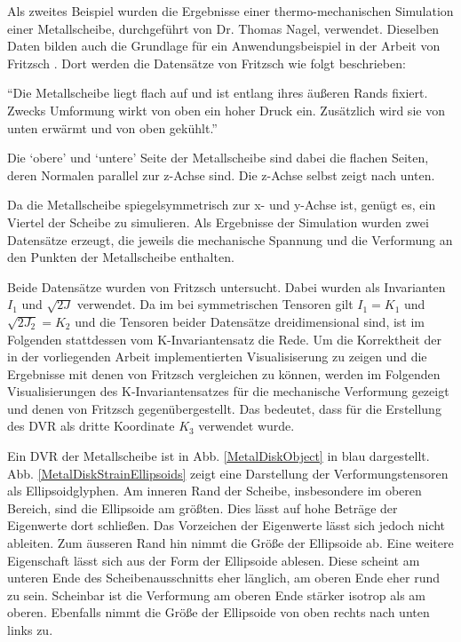 \documentclass[a4paper,fontsize=12pt,toc=bib,halfparskip]{scrartcl}
\begin{document}
Als zweites Beispiel wurden die Ergebnisse einer thermo-mechanischen Simulation einer Metallscheibe, durchgef\"uhrt von Dr. Thomas Nagel, verwendet. Dieselben Daten bilden auch die Grundlage f\"ur ein Anwendungsbeispiel in der Arbeit von Fritzsch \cite[S.15,~45~ ff.]{fritzsch2016continuousScatterplot}. Dort werden die Datens\"atze von Fritzsch wie folgt beschrieben:

``Die Metallscheibe liegt flach auf und ist entlang ihres \"au{\ss}eren Rands fixiert. Zwecks Umformung wirkt von oben ein hoher Druck ein. Zus\"atzlich wird sie von unten erw\"armt und von oben gek\"uhlt.''\cite[S.~15]{fritzsch2016continuousScatterplot}

Die `obere' und `untere' Seite der Metallscheibe sind dabei die flachen Seiten, deren Normalen parallel zur z-Achse sind. Die z-Achse selbst zeigt nach unten.

Da die Metallscheibe spiegelsymmetrisch zur x- und y-Achse ist, gen\"ugt es, ein Viertel der Scheibe zu simulieren. Als Ergebnisse der Simulation wurden zwei Datens\"atze erzeugt, die jeweils die mechanische Spannung und die Verformung an den Punkten der Metallscheibe enthalten. 

Beide Datens\"atze wurden von Fritzsch untersucht. Dabei wurden als Invarianten $I_1$ und $\sqrt{2J}$ verwendet. Da im bei symmetrischen Tensoren gilt $I_1 = K_1$ und $\sqrt{2J_2} = K_2$ und die Tensoren beider Datens\"atze dreidimensional sind, ist im Folgenden stattdessen vom K-Invariantensatz die Rede. Um die Korrektheit der in der vorliegenden Arbeit implementierten Visualisiserung zu zeigen und die Ergebnisse mit denen von Fritzsch vergleichen zu k\"onnen, werden im Folgenden Visualisierungen des K-Invariantensatzes f\"ur die mechanische Verformung gezeigt und denen von Fritzsch gegen\"ubergestellt. Das bedeutet, dass f\"ur die Erstellung des DVR als dritte Koordinate $K_3$ verwendet wurde.

Ein DVR der Metallscheibe ist in Abb. \ref{MetalDiskObject} in blau dargestellt. Abb. \ref{MetalDiskStrainEllipsoids} zeigt eine Darstellung der Verformungstensoren als Ellipsoidglyphen. Am inneren Rand der Scheibe, insbesondere im oberen Bereich, sind die Ellipsoide am gr\"o{\ss}ten. Dies l\"asst auf hohe Betr\"age der Eigenwerte dort schlie{\ss}en. Das Vorzeichen der Eigenwerte l\"asst sich jedoch nicht ableiten. Zum \"ausseren Rand hin nimmt die Gr\"o{\ss}e der Ellipsoide ab. Eine weitere Eigenschaft l\"asst sich aus der Form der Ellipsoide ablesen. Diese scheint am unteren Ende des Scheibenausschnitts eher l\"anglich, am oberen Ende eher rund zu sein. Scheinbar ist die Verformung am oberen Ende st\"arker isotrop als am oberen. Ebenfalls nimmt die Gr\"o{\ss}e der Ellipsoide von oben rechts nach unten links zu.
\end{document}
